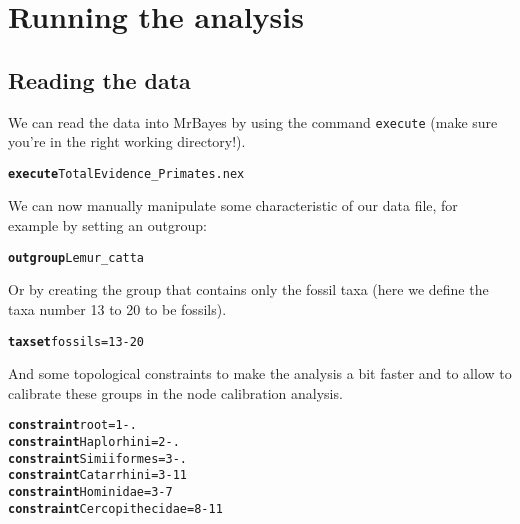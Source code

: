 \documentclass{article}\usepackage[]{graphicx}\usepackage[]{color}
\makeatletter
\newcommand{\hlstr}[1]{\textcolor[rgb]{0.192,0.494,0.8}{#1}}%
\newcommand{\hlkwd}[1]{\textcolor[rgb]{0.737,0.353,0.396}{\textbf{#1}}}%
\newenvironment{kframe}{%
 \def\at@end@of@kframe{}%
 \ifinner\ifhmode%
  \def\at@end@of@kframe{\end{minipage}}%
  \begin{minipage}{\columnwidth}%
 \fi\fi%
 \def\FrameCommand##1{\hskip\@totalleftmargin \hskip-\fboxsep
 \colorbox{shadecolor}{##1}\hskip-\fboxsep
     \hskip-\linewidth \hskip-\@totalleftmargin \hskip\columnwidth}%
 \MakeFramed {\advance\hsize-\width
   \@totalleftmargin\z@ \linewidth\hsize
   \@setminipage}}%
 {\par\unskip\endMakeFramed%
 \at@end@of@kframe}
\newenvironment{knitrout}{}{} %
\makeatother
\begin{document}
\section{Running the analysis}
\subsection{Reading the data}
We can read the data into MrBayes by using the command \texttt{execute} (make sure you're in the right working directory!).
\begin{knitrout}
\color{fgcolor}\begin{kframe}
\begin{alltt}
\hlkwd{execute} \hlstr{TotalEvidence\_Primates.nex}
\end{alltt}
\end{kframe}
\end{knitrout}

We can now manually manipulate some characteristic of our data file, for example by setting an outgroup:

\begin{knitrout}
\color{fgcolor}\begin{kframe}
\begin{alltt}
\hlkwd{outgroup} \hlstr{Lemur_catta}
\end{alltt}
\end{kframe}
\end{knitrout}

\noindent Or by creating the group that contains only the fossil taxa (here we define the taxa number 13 to 20 to be fossils).

\begin{knitrout}
\color{fgcolor}\begin{kframe}
\begin{alltt}
\hlkwd{taxset} \hlstr{fossils}=13-20
\end{alltt}
\end{kframe}
\end{knitrout}

\noindent And some topological constraints to make the analysis a bit faster and to allow to calibrate these groups in the node calibration analysis.
\begin{knitrout}
\color{fgcolor}\begin{kframe}
\begin{alltt}
\hlkwd{constraint} \hlstr{root}=\hlstr{1-.}
\hlkwd{constraint} \hlstr{Haplorhini}=\hlstr{2-.}
\hlkwd{constraint} \hlstr{Simiiformes}=\hlstr{3-.}
\hlkwd{constraint} \hlstr{Catarrhini}=\hlstr{3-11}
\hlkwd{constraint} \hlstr{Hominidae}=\hlstr{3-7}
\hlkwd{constraint} \hlstr{Cercopithecidae}=\hlstr{8-11}
\end{alltt}
\end{kframe}
\end{knitrout}
\end{document}
